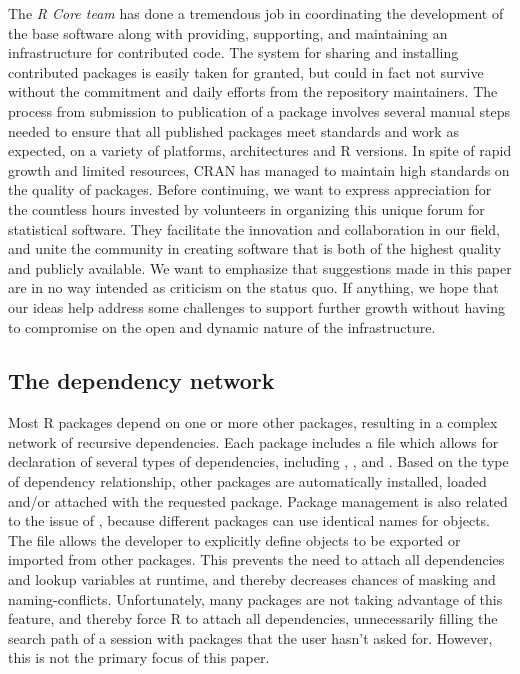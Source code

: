 The \emph{R Core team} has done a tremendous job in coordinating the
development of the base software along with providing, supporting, and maintaining an
infrastructure for contributed code. The system for sharing and installing
contributed packages is easily taken for granted, but could in fact not
survive without the commitment and daily efforts from the repository
maintainers. The process from submission to publication of a package involves
several manual steps needed to ensure that all published packages
meet standards and work as expected, on a variety of platforms, architectures
and R versions. In spite of rapid growth and limited resources, CRAN has
managed to maintain high standards on the quality of packages. Before
continuing, we want to express appreciation for the countless hours invested
by volunteers in organizing this unique forum for statistical software.
They facilitate the innovation and collaboration in our field,
and unite the community in creating software that is both of the highest
quality and publicly available. We want to emphasize that suggestions made in
this paper are in no way intended as criticism on the status quo. If anything,
we hope that our ideas help address some challenges to support further growth
without having to compromise on the open and dynamic nature of the
infrastructure.

\subsection{The dependency network}

Most R packages depend on one or more other packages, resulting in a complex
network of recursive dependencies. Each package includes a 
file which allows for declaration of several types of dependencies, including
, ,  and . Based on
the type of dependency relationship, other packages are automatically
installed, loaded and/or attached with the requested package. Package
management is also related to the issue of , because different
packages can use identical names for objects. The  file allows
the developer to explicitly define objects to be exported or imported from
other packages. This prevents the need to attach all dependencies and lookup
variables at runtime, and thereby decreases chances of masking and
naming-conflicts. Unfortunately, many packages are not taking advantage of this
feature, and thereby force R to attach all dependencies, unnecessarily filling
the search path of a session with packages that the user hasn't asked for.
However, this is not the primary focus of this paper.

